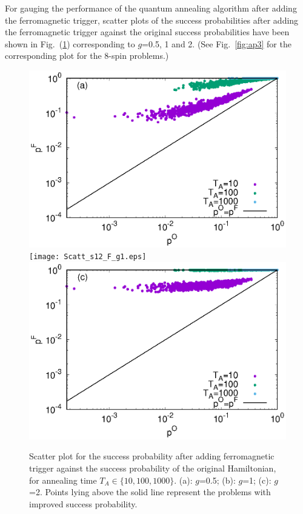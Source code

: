 \documentclass[../main.tex]{subfiles}
\begin{document}
For gauging the performance of the quantum annealing algorithm after adding the ferromagnetic trigger, scatter plots of the success probabilities after adding the ferromagnetic trigger against the original success probabilities have been shown in Fig.~(\ref{fig:f11}) corresponding to $g$=0.5, 1 and 2. (See Fig.~\ref{fig:ap3} for the corresponding plot for the 8-spin problems.)
\begin{figure}[H]
\centering 
\includegraphics[scale=0.8]{Scatt_s12_F_g0.eps}
\texttt{[image: Scatt\_s12\_F\_g1.eps]}
\includegraphics[scale=0.8]{Scatt_s12_F_g2.eps}
\caption{Scatter plot for the success probability after adding ferromagnetic trigger against the success probability of the original Hamiltonian, for annealing time $T_A \in \{10,100,1000\}$. (a): $g$=0.5; (b): $g$=1; (c): $g$=2. Points lying above the solid line represent the problems with improved success probability.}
\label{fig:f11}
\end{figure}
\end{document}
